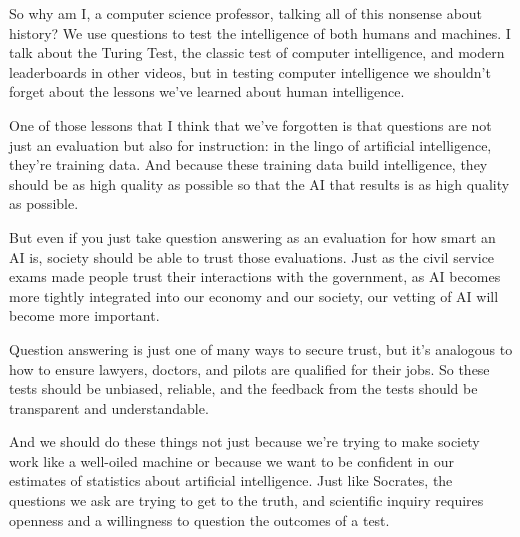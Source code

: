 So why am I, a computer science professor, talking all of this nonsense about history?  We use questions to test the intelligence of both humans and machines.  I talk about the Turing Test, the classic test of computer intelligence, and modern leaderboards in other videos, but in testing computer intelligence we shouldn’t forget about the lessons we’ve learned about human intelligence.

One of those lessons that I think that we’ve forgotten is that questions are not just an evaluation but also for instruction: in the lingo of artificial intelligence, they’re training data.  And because these training data build intelligence, they should be as high quality as possible so that the AI that results is as high quality as possible.

But even if you just take question answering as an evaluation for how smart an AI is, society should be able to trust those evaluations.  Just as the civil service exams made people trust their interactions with the government, as AI becomes more tightly integrated into our economy and our society, our vetting of AI will become more important.

Question answering is just one of many ways to secure trust, but it’s analogous to how to ensure lawyers, doctors, and pilots are qualified for their jobs.  So these tests should be unbiased, reliable, and the feedback from the tests should be transparent and understandable.

And we should do these things not just because we’re trying to make society work like a well-oiled machine or because we want to be confident in our estimates of statistics about artificial intelligence.  Just like Socrates, the questions we ask are trying to get to the truth, and scientific inquiry requires openness and a willingness to question the outcomes of a test.
